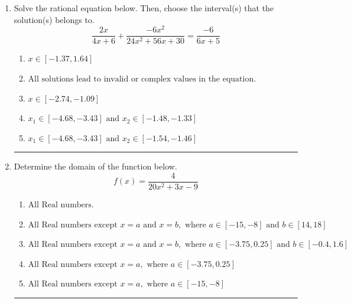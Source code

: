 \documentclass[14pt]{extbook}
\newcommand{\litem}[1]{\item#1\hspace*{-1cm}\rule{\textwidth}{0.4pt}}
\begin{document}
\begin{enumerate}
{\begin{enumerate}[label=\Alph*.]
\end{enumerate} }
\litem{
Solve the rational equation below. Then, choose the interval(s) that the solution(s) belongs to.\[ \frac{2x}{4x + 6} + \frac{-6x^{2}}{24x^{2} +56 x + 30} = \frac{-6}{6x + 5} \]\begin{enumerate}[label=\Alph*.]
\item \( x \in [-1.37,1.64] \)
\item \( \text{All solutions lead to invalid or complex values in the equation.} \)
\item \( x \in [-2.74,-1.09] \)
\item \( x_1 \in [-4.68, -3.43] \text{ and } x_2 \in [-1.48,-1.33] \)
\item \( x_1 \in [-4.68, -3.43] \text{ and } x_2 \in [-1.54,-1.46] \)

\end{enumerate} }
\litem{
Determine the domain of the function below.\[ f(x) = \frac{4}{20x^{2} +3 x -9} \]\begin{enumerate}[label=\Alph*.]
\item \( \text{All Real numbers.} \)
\item \( \text{All Real numbers except } x = a \text{ and } x = b, \text{ where } a \in [-15, -8] \text{ and } b \in [14, 18] \)
\item \( \text{All Real numbers except } x = a \text{ and } x = b, \text{ where } a \in [-3.75, 0.25] \text{ and } b \in [-0.4, 1.6] \)
\item \( \text{All Real numbers except } x = a, \text{ where } a \in [-3.75, 0.25] \)
\item \( \text{All Real numbers except } x = a, \text{ where } a \in [-15, -8] \)


\end{enumerate}}
\end{enumerate}
\end{document}
